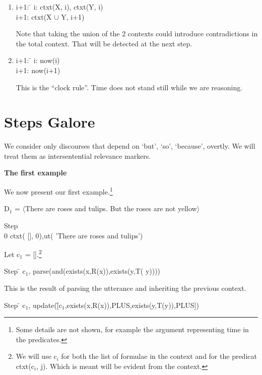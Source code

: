 \documentclass{article}
\begin{document}
\begin{enumerate}
\item
\begin{tabbing}
i+1: \= \kill
i:\> ctxt(X, i), ctxt(Y, i)\\
i+1:\> ctxt(X $\cup$ Y, i+1)
\end{tabbing}
Note that taking the union of the 2 contexts could introduce
contradictions in the total context. That will be detected at the next
step.

\item
\begin{tabbing}
i+1: \= \kill
i:\> now(i)\\
i+1: \> now(i+1)
\end{tabbing}
This is the ``clock rule''. Time does not stand still while we are reasoning.

\end{enumerate}


\section{Steps Galore}
 

We consider only discourses that depend on `but', `so', `because',
overtly. We will treat them as intersentential relevance markers.

\noindent
\textbf{The first example} 

We now present our first example.\footnote{Some details
are not shown, for example the argument representing time in the
predicates.}

D$_1$ = $\langle$There are roses and tulips. But the roses are not
yellow$\rangle$

\begin{tabbing}
Step \= \\
0\> ctxt( [], 0),ut( 'There are roses and tulips')
\end{tabbing}

Let c$_1$ = [].\footnote{We will use c$_i$ for both the list of
formulae in the context and for the predicat ctxt(c$_i$, j). Which is
meant will be evident from the context.}

\begin{tabbing}
Step \= \> c$_1$, parse(and(exists(x,R(x)),exists(y,T( y))))
\end{tabbing}

This is the result of parsing the utterance and inheriting the
previous context.

\begin{tabbing}
Step \= \> c$_1$, update(\=[c$_1$,exists(x,R(x)),PLUS,exists(y,T(y)),PLUS])
\end{tabbing}
\end{document}
